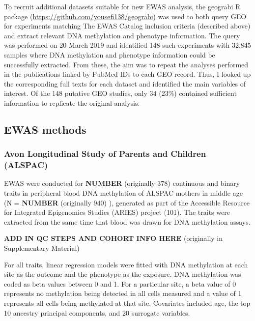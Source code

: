\documentclass[11pt,twoside]{bristolthesis}
\begin{document}
To recruit additional datasets suitable for new EWAS analysis, the geograbi R package (\url{https://github.com/yousefi138/geograbi}) was used to both query GEO for experiments matching The EWAS Catalog inclusion criteria (described above) and extract relevant DNA methylation and phenotype information. The query was performed on 20 March 2019 and identified 148 such experiments with 32,845 samples where DNA methylation and phenotype information could be successfully extracted. From these, the aim was to repeat the analyses performed in the publications linked by PubMed IDs to each GEO record. Thus, I looked up the corresponding full texts for each dataset and identified the main variables of interest. Of the 148 putative GEO studies, only 34 (23\%) contained sufficient information to replicate the original analysis.

\hypertarget{ewas-methods}{%
\subsection{EWAS methods}\label{ewas-methods}}

\hypertarget{avon-longitudinal-study-of-parents-and-children-alspac}{%
\subsubsection{Avon Longitudinal Study of Parents and Children (ALSPAC)}\label{avon-longitudinal-study-of-parents-and-children-alspac}}

EWAS were conducted for \textbf{NUMBER} (originally 378) continuous and binary traits in peripheral blood DNA methylation of ALSPAC mothers in middle age (N = \textbf{NUMBER} (originally 940) ), generated as part of the Accessible Resource for Integrated Epigenomics Studies (ARIES) project (101). The traits were extracted from the same time that blood was drawn for DNA methylation assays.

\textbf{ADD IN QC STEPS AND COHORT INFO HERE} (originally in Supplementary Material)

For all traits, linear regression models were fitted with DNA methylation at each site as the outcome and the phenotype as the exposure. DNA methylation was coded as beta values between 0 and 1. For a particular site, a beta value of 0 represents no methylation being detected in all cells measured and a value of 1 represents all cells being methylated at that site. Covariates included age, the top 10 ancestry principal components, and 20 surrogate variables.
\end{document}
